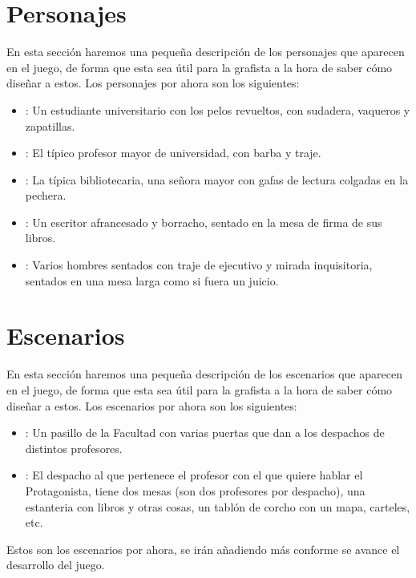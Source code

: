     \section{Personajes}
    En esta sección haremos una pequeña descripción de los personajes que aparecen en el juego, de forma que esta sea útil para la grafista a la hora de saber cómo diseñar a estos. Los personajes por ahora son los siguientes:
    
    \begin{itemize}
    \item {}: Un estudiante universitario con los pelos revueltos, con sudadera, vaqueros y zapatillas.
    \item {}: El típico profesor mayor de universidad, con barba y traje.
    \item {}: La típica bibliotecaria, una señora mayor con gafas de lectura colgadas en la pechera.
    \item {}: Un escritor afrancesado y borracho, sentado en la mesa de firma de sus libros.
    \item {}: Varios hombres sentados con traje de ejecutivo y mirada inquisitoria, sentados en una mesa larga como si fuera un juicio.
    \end{itemize}
    
    \section{Escenarios}
    En esta sección haremos una pequeña descripción de los escenarios que aparecen en el juego, de forma que esta sea útil para la grafista a la hora de saber cómo diseñar a estos. Los escenarios por ahora son los siguientes:
    
    \begin{itemize}
    \item {}: Un pasillo de la Facultad con varias puertas que dan a los despachos de distintos profesores.
    \item {}: El despacho al que pertenece el profesor con el que quiere hablar el Protagonista, tiene dos mesas (son dos profesores por despacho), una estanteria con libros y otras cosas, un tablón de corcho con un mapa, carteles, etc.
    \end{itemize}
    
    Estos son los escenarios por ahora, se irán añadiendo más conforme se avance el desarrollo del juego.
    
